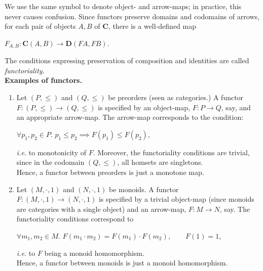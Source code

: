 \documentclass[]{amsbook}
\newcommand{\qq}{\qquad}
\newcommand{\catname}[1]{\mathbf{#1}}
\newcommand{\0}{\mathbf{0}}
\newcommand{\1}{\mathbf{1}}
\begin{document}
We use the same symbol to denote object- and arrow-maps; in practice, this
never causes confusion. Since functors preserve domains and codomains of arrows,
for each pair of objects $A, B$ of $\catname{C}$, there is a well-defined map
\begin{center}
    $F_{A, B} : \catname{C}(A, B) \to \catname{D}(FA, FB)$.
\end{center}

The conditions expressing preservation of composition and identities are called
\emph{functoriality}.\\

\textbf{Examples of functors.}
\begin{enumerate}
    \item Let $(P, \le)$ and $(Q, \le)$ be preorders (seen as categories.) A
    functor $F: (P, \le) \to (Q, \le)$ is specified by an object-map, $F: P \to
    Q$, say, and an appropriate arrow-map. The arrow-map corresponds to the
    condition:
    \begin{center}
        $\forall p_1, p_2 \in P. \,\, p_1 \le p_2 \implies F(p_1) \le F(p_2)$,
    \end{center}
    \emph{i.e.} to monotonicity of $F$. Moreover, the functoriality conditions
    are trivial, since in the codomain $(Q, \le)$, all homsets are singletons.\\
    Hence, a functor between preorders is just a monotone map.

    \item Let $(M, \cdot, 1)$ and $(N, \cdot, 1)$ be monoids. A functor $F:
    (M, \cdot, 1) \to (N, \cdot, 1)$ is specified by a trivial object-map (since
    monoids are categories with a single object) and an arrow-map, $F: M \to N$,
    say. The functoriality conditions correspond to
    \begin{center}
        $\forall m_1, m_2 \in M. \,\, F(m_1 \cdot m_2) = F(m_1) \cdot F(m_2),
        \qq F(1) = 1$,
    \end{center}
    \emph{i.e.} to $F$ being a monoid homomorphism.\\
    Hence, a functor between monoids is just a monoid homomorphism.
\end{enumerate}
\end{document}
